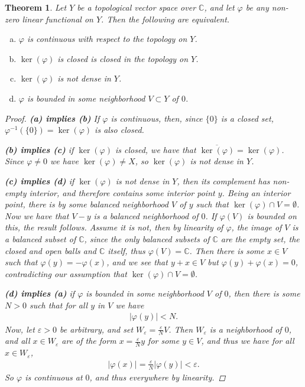 \documentclass[10pt,twoside,openany,final]{memoir}
\theoremstyle{break}
\newtheorem{theorem}[section]{Theorem}
\theoremstyle{Break}
\newcommand{\C}{\mathbb{C}}
\begin{document}
\begin{theorem}\label{rudin 1.18}
Let $Y$ be a topological vector space over $\C$, and let $\varphi$ be any non-zero linear functional on $Y$. Then the following are equivalent.
\begin{enumerate}[(a)]
\item $\varphi$ is continuous with respect to the topology on $Y$.
\item $\ker(\varphi)$ is closed is closed in the topology on $Y$.
\item $\ker(\varphi)$ is not dense in $Y$.
\item $\varphi$ is bounded in some neighborhood $V \subset Y$ of $0$.
\end{enumerate}
\begin{proof}
\indent \textbf{(a) implies (b)} If $\varphi$ is continuous, then, since $\{0\}$ is a closed set, $\varphi^{-1}(\{0\})=\ker(\varphi)$ is also closed. 

\textbf{(b) implies (c)} if $\ker(\varphi)$ is closed, we have that $\overline{\ker(\varphi)}=\ker(\varphi)$. Since $\varphi\neq 0$ we have $\ker(\varphi)\neq X$, so $\ker(\varphi)$ is not dense in $Y$.

\textbf{(c) implies (d)} if $\ker(\varphi)$ is not dense in $Y$, then its complement has non-empty interior, and therefore contains some interior point $y$. Being an interior point, there is by  some balanced neighborhood $V$ of $y$ such that $\ker(\varphi) \cap V=\emptyset$. Now we have that $V-y$ is a balanced neighborhood of $0$. If $\varphi(V)$ is bounded on this, the result follows. Assume it is not, then by linearity of $\varphi$, the image of $V$ is a balanced subset of $\C$, since the only balanced subsets of $\C$ are the empty set, the closed and open balls and $\C$ itself, thus $\varphi(V)=\C$. Then there is some $x \in V$ such that $\varphi(y)=-\varphi(x)$, and we see that $y+x \in V$ but $\varphi(y)+\varphi(x)=0$, contradicting our assumption that $\ker(\varphi) \cap V=\emptyset$.

\textbf{(d) implies (a)} if $\varphi$ is bounded in some neighborhood $V$ of $0$, then there is some $N > 0$ such that for all $y$ in $V$ we have
\begin{align*}
|\varphi(y)|<N.
\end{align*}
Now, let $\varepsilon>0$ be arbitrary, and set $W_{\varepsilon}=\frac{\varepsilon}{N} V$. Then $W_{\varepsilon}$ is a neighborhood of $0$, and all $x\in W_{\varepsilon}$ are of the form $x=\frac{\varepsilon}{N}y$ for some $y \in V$, and thus we have for all $x \in W_{\varepsilon}$,
\begin{align*}
|\varphi(x)|=\frac{\varepsilon}{N}|\varphi(y)|< \varepsilon.
\end{align*}
So $\varphi$ is continuous at $0$, and thus everywhere by linearity.
\end{proof}
\end{theorem}
\end{document}
